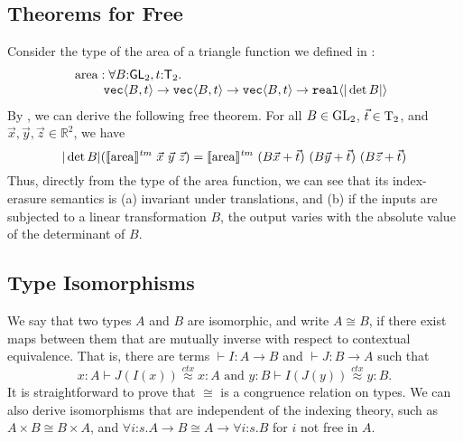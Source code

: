 \subsection{Theorems for Free}
\label{sec:theorems-for-free}

Consider the type of the area of a triangle function we defined in
:
\begin{displaymath}
  \begin{array}{@{}l}
    \mathrm{area} : \forall B\mathord:\SynGL{2}, t\mathord:\SynTransl{2}.\ \\
    \hspace{0.8cm}\tyPrim{vec}{B, t} \to \tyPrim{vec}{B, t} \to \tyPrim{vec}{B, t} \to \tyPrim{real}{|\det B|}
  \end{array}
\end{displaymath}
By , we can derive the following free theorem. For all $B \in \mathrm{GL}_2$, $\vec{t} \in \mathrm{T}_2$, and $\vec{x}, \vec{y}, \vec{z} \in \mathbb{R}^2$, we have 
\begin{displaymath}
  |\det B|(\tmSem{\mathrm{area}}\ \vec{x}\ \vec{y}\ \vec{z}) = \tmSem{\mathrm{area}}\ (B\vec{x} + \vec{t})\ (B\vec{y} + \vec{t})\ (B\vec{z} + \vec{t})
\end{displaymath}
Thus, directly from the type of the $\mathrm{area}$ function, we can
see that its index-erasure semantics is (a) invariant under
translations, and (b) if the inputs are subjected to a linear
transformation $B$, the output varies with the absolute value of the
determinant of $B$.




\subsection{Type Isomorphisms}
\label{sec:types-indexed-abelian-groups}
We say that two types $A$ and $B$ are isomorphic, and write $A \cong B$, if there exist maps
between them that are mutually inverse with respect to contextual equivalence. That is, 
there are terms $\vdash I : A \to B$ and $\vdash J : B\to A$ such
that
\[
x:A\vdash J(I(x))\stackrel{ctx}\approx x : A
\text{ and }y:B\vdash I(J(y))\stackrel{ctx}\approx y : B.
\]
It is straightforward to prove that $\cong$ is a congruence relation on types. We
can also derive isomorphisms that are independent of the indexing theory, such as
$A\times B \cong B \times A$, and $\forall i\mathord:s.A\to B\cong A\to\forall i\mathord:s.B$ for $i$ not free in $A$.

